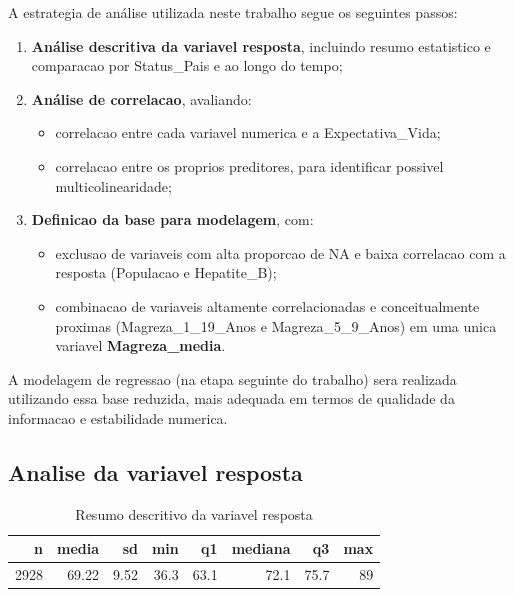 \documentclass[
  12pt,
]{article}
\providecommand{\tightlist}{%
  \setlength{\itemsep}{0pt}\setlength{\parskip}{0pt}}
\begin{document}
A estrategia de análise utilizada neste trabalho segue os seguintes
passos:

\begin{enumerate}
\def\labelenumi{\arabic{enumi}.}
\tightlist
\item
  \textbf{Análise descritiva da variavel resposta}, incluindo resumo
  estatistico e comparacao por Status\_Pais e ao longo do tempo;
\item
  \textbf{Análise de correlacao}, avaliando:

  \begin{itemize}
  \tightlist
  \item
    correlacao entre cada variavel numerica e a Expectativa\_Vida;
  \item
    correlacao entre os proprios preditores, para identificar possivel
    multicolinearidade;
  \end{itemize}
\item
  \textbf{Definicao da base para modelagem}, com:

  \begin{itemize}
  \tightlist
  \item
    exclusao de variaveis com alta proporcao de NA e baixa correlacao
    com a resposta (Populacao e Hepatite\_B);
  \item
    combinacao de variaveis altamente correlacionadas e conceitualmente
    proximas (Magreza\_1\_19\_Anos e Magreza\_5\_9\_Anos) em uma unica
    variavel \textbf{Magreza\_media}.
  \end{itemize}
\end{enumerate}

A modelagem de regressao (na etapa seguinte do trabalho) sera realizada
utilizando essa base reduzida, mais adequada em termos de qualidade da
informacao e estabilidade numerica.

\subsection{Analise da variavel
resposta}\label{analise-da-variavel-resposta}

\begin{longtable}[t]{rrrrrrrr}
\caption{\label{tab:unnamed-chunk-5}Resumo descritivo da variavel resposta}\\
\toprule
n & media & sd & min & q1 & mediana & q3 & max\\
\midrule
2928 & 69.22 & 9.52 & 36.3 & 63.1 & 72.1 & 75.7 & 89\\
\bottomrule
\end{longtable}
\end{document}
